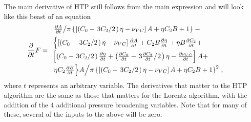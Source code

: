 The main derivative of HTP still follows from the main expression and will look like
this beast of an equation
\begin{equation}
 \frac{\partial}{\partial t} F = 
 \begin{array}{l}
   \left.\frac{\partial A}{\partial t} \middle/\pi \left\{\left[\left(C_0 - \left.3C_2\middle/2\right.\right) \eta - \nu_{VC}\right] A + \eta C_2 B + 1\right\} \right. - \\[5pt]
   \Bigl\{
   \left[\left(C_0 - \left.3C_2\middle/2\right.\right) \eta - \nu_{VC}\right] \frac{\partial A}{\partial t} + C_2 B \frac{\partial \eta}{\partial t} + \eta B \frac{\partial C_2}{\partial t} + \\[5pt]
   \left[\left(C_0 - \left.3C_2\middle/2\right.\right) \frac{\partial \eta}{\partial t} + \left(\frac{\partial C_0}{\partial t} - \left.3\frac{\partial C_2}{\partial t}\middle/2\right.\right) \eta - \frac{\partial \nu_{VC}}{\partial t}\right] A +  \\[5pt]
   \left. \eta C_2 \frac{\partial B}{\partial t}
   \Bigr\} A \middle/ \pi \left\{\left[\left(C_0 - \left.3C_2\middle/2\right.\right) \eta - \nu_{VC}\right] A + \eta C_2 B + 1\right\}^2 \right.,
 \end{array}
\end{equation}
where $t$ represents an arbitrary variable.
The derivatives that matter to the HTP algorithm are the same as those
that matters for the Lorentz algorithm, with the addition of the 4
additional pressure broadening variables.  Note that for many of these,
several of the inputs to the above will be zero.

